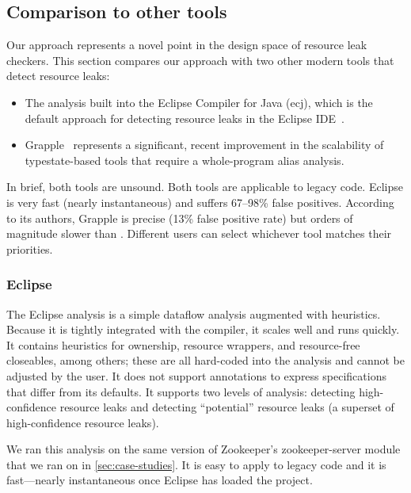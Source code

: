 \subsection{Comparison to other tools}
\label{sec:compare}

Our approach represents a novel point in the design space of resource leak checkers.
%
This section compares our approach with two other modern tools that detect resource leaks:
\begin{itemize}
\item The analysis built into the Eclipse Compiler for Java (ecj), which is the default approach
  for detecting resource leaks in the Eclipse IDE~\cite{ecj-resource-leak}.
\item Grapple~\cite{zuo2019grapple} represents a significant, recent
  improvement in the scalability of typestate-based tools that require a whole-program alias analysis.
\end{itemize}
In brief, both tools are unsound.
Both tools are applicable to legacy code. %
Eclipse is very fast (nearly instantaneous) and suffers 67--98\% false
positives. %
According to its authors, Grapple is precise (13\% false positive rate) but orders
of magnitude slower than \Tool.
Different users can select whichever tool matches
their priorities.


\subsubsection{Eclipse}
\label{sec:eclipse}

The Eclipse analysis is a simple dataflow analysis
augmented with heuristics. Because it is tightly integrated with
the compiler, it scales well and runs quickly. It contains
heuristics for ownership, resource wrappers, and resource-free
closeables, among others; these are all hard-coded into the analysis and cannot
be adjusted by the user. It does not support annotations to express
specifications that differ from its defaults.
It supports two levels of analysis: detecting high-confidence resource
leaks and detecting ``potential'' resource
leaks (a superset of high-confidence resource leaks).

We ran this analysis on the same version of Zookeeper's zookeeper-server
module that we ran \Tool on in \cref{sec:case-studies}. It is easy to apply
to legacy code and it is fast---nearly instantaneous once Eclipse
has loaded the project.

